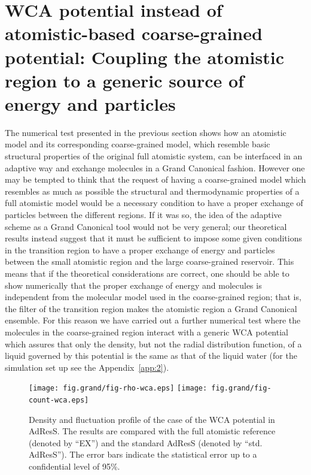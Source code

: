 \documentclass[aip,jcp,a4paper,reprint,onecolumn]{revtex4-1}
\begin{document}
\section{WCA potential instead of atomistic-based coarse-grained potential: Coupling the atomistic region to a generic source of energy and particles}
The numerical test presented in the previous section shows how an atomistic model and its corresponding coarse-grained model, which resemble basic structural properties of the original full atomistic system, can be interfaced in an adaptive way and exchange molecules in a Grand Canonical fashion. However one may be tempted to think that the request of having a coarse-grained model which resembles as much as possible the structural and thermodynamic properties of a full atomistic model would be a necessary condition to have a proper exchange of particles between the different regions. If it was so, the idea of the adaptive scheme as a Grand Canonical tool would not be very general; our theoretical results instead suggest that it must be sufficient to impose some given conditions in the transition region to have a proper exchange of energy and particles between the small atomistic region and the large coarse-grained reservoir. 
This means that if the theoretical considerations are correct, one should be able to show numerically that the proper exchange of energy and molecules is independent from the molecular model used in the coarse-grained region; that is, the filter of the transition region makes the atomistic region a Grand Canonical ensemble. For this reason we have carried out a further numerical test where the molecules in the coarse-grained region interact with a generic WCA potential which assures that only the density, but not the radial distribution function, of a liquid governed by this potential is the same as that of the liquid water (for the simulation set up see the Appendix~\ref{app:2}).
\begin{figure}
  \centering
  \texttt{[image: fig.grand/fig-rho-wca.eps]}
  \texttt{[image: fig.grand/fig-count-wca.eps]}
  \caption{Density and fluctuation profile of the case of the WCA potential in AdResS.  The
    results are compared with the full atomistic reference (denoted by
    ``EX'') and the  standard AdResS (denoted by ``std. AdResS'').
    The error bars indicate the statistical error up to a confidential
    level of 95\%.
  }
  \label{fig:wca-den}
\end{figure}
\end{document}
